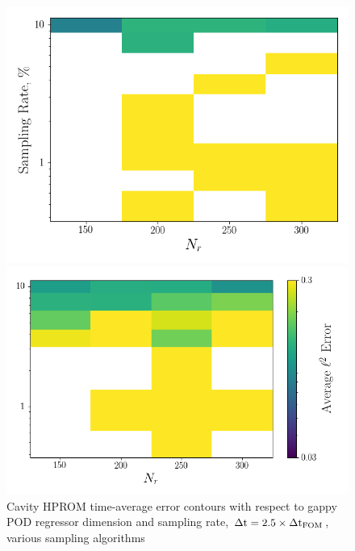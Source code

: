 \begin{figure}
	\begin{minipage}{0.46\linewidth}
		\includegraphics[width=0.99\linewidth]{Chapters/CavityAndCVRC/Images/cavity/deim/err_contour_gnat1_dt2p5e-6.png}
	\end{minipage}
	\begin{minipage}{0.53\linewidth}
		\includegraphics[width=0.99\linewidth]{Chapters/CavityAndCVRC/Images/cavity/deim/err_contour_gnat2_dt2p5e-6.png}
	\end{minipage}
	\caption{Cavity HPROM time-average error contours with respect to gappy POD regressor dimension and sampling rate, $\Delta \text{t} = 2.5 \times \Delta \text{t}_{\text{FOM}}$, various sampling algorithms}
\end{figure}

